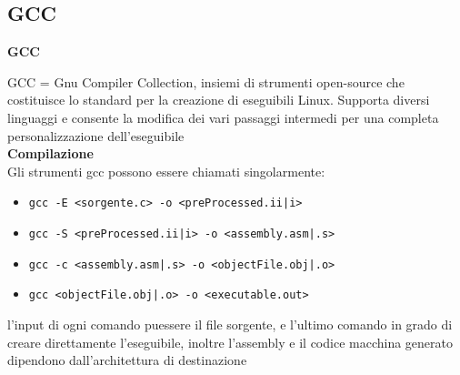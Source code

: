 \subsection{GCC}
\begin{flushleft}
  \textbf{GCC} \par 
  GCC = Gnu Compiler Collection, insiemi di strumenti open-source che costituisce 
  lo standard per la creazione di eseguibili Linux. Supporta diversi linguaggi e consente
  la modifica dei vari passaggi intermedi per una completa personalizzazione dell'eseguibile\\
  \textbf{Compilazione} \\
  Gli strumenti gcc possono essere chiamati singolarmente:
  \begin{itemize}
    \item \texttt{gcc -E <sorgente.c> -o <preProcessed.ii|i>}
    \item \texttt{gcc -S <preProcessed.ii|i> -o <assembly.asm|.s>}
    \item \texttt{gcc -c <assembly.asm|.s> -o <objectFile.obj|.o>}
    \item \texttt{gcc <objectFile.obj|.o> -o <executable.out>}
  \end{itemize}
  l'input di ogni comando pu\aco essere il file sorgente, e l'ultimo comando \ace in grado di creare
  direttamente l'eseguibile, inoltre l'assembly e il codice macchina generato dipendono 
  dall'architettura di destinazione
\end{flushleft}
